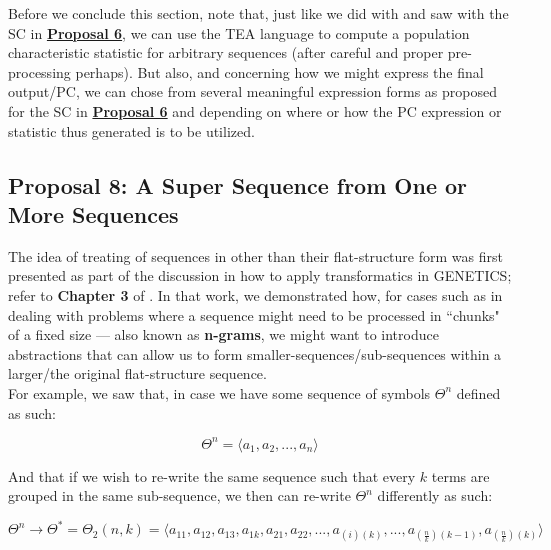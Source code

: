 \documentclass[a4paper, 18pt]{book} %
\begin{document}
\begin{appendices}
Before we conclude this section, note that, just like we did with and saw with the SC in \textbf{\hyperref[PROP6]{Proposal 6}}, we can use the TEA language to compute a population characteristic statistic for arbitrary sequences (after careful and proper pre-processing perhaps). But also, and concerning how we might express the final output/PC, we can chose from several meaningful expression forms as proposed for the SC in \textbf{\hyperref[PROP6]{Proposal 6}} and depending on where or how the PC expression or statistic thus generated is to be utilized.

\subsection{Proposal 8: A Super Sequence from One or More Sequences\cite{lutalo_2025_trans_genetics}}
\label{PROP8}

The idea of treating of sequences in other than their flat-structure form was first presented as part of the discussion in how to apply transformatics in GENETICS\cite{lutalo_2025_trans_genetics}; refer to \textbf{Chapter 3} of \cite{lutalo_2025_trans_genetics}. In that work, we demonstrated how, for cases such as in dealing with problems where a sequence might need to be processed in ``chunks" of a fixed size --- also known as \textbf{n-grams}, we might want to introduce abstractions that can allow us to form smaller-sequences/sub-sequences within a larger/the original flat-structure sequence.\\

For example, we saw that, in case we have some sequence of symbols $\Theta^n$ defined as such:

\vspace{1em}
\begin{equation}
\label{EQSEQ1b}
\Theta^n = \langle a_1, a_2,...,a_n\rangle
\end{equation}
\vspace{1em}

And that if we wish to re-write the same sequence such that every $k$ terms are grouped in the same sub-sequence, we then can re-write $\Theta^n$ differently as such:

\vspace{1em}
\begin{equation}
\label{EQSEQ2b}
\Theta^n \rightarrow \Theta^* = \Theta_2(n,k) = \langle a_{11}, a_{12}, a_{13}, a_{1k}, a_{21}, a_{22},...,a_{(i)(k)},...,a_{(\frac{n}{k})(k-1)},a_{(\frac{n}{k})(k)}\rangle
\end{equation}
\vspace{1em}



\end{appendices}
\end{document}
